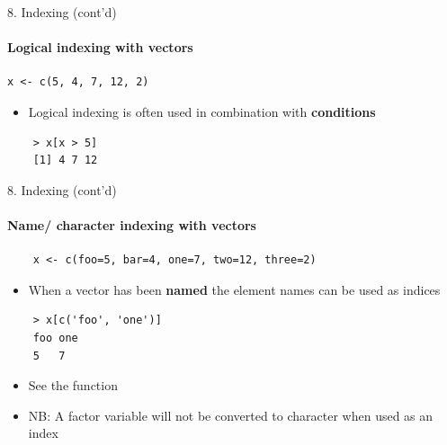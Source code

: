 \documentclass[14pt, aspectratio=169, sectionpage=simple, xclolor=table]{beamer}
\begin{document}
\begin{frame}[fragile]{8. Indexing (cont'd)}
\framesubtitle{Logical indexing with vectors}
\vspace*{-0.3ex}
{\small
\begin{verbatim}
x <- c(5, 4, 7, 12, 2)	
\end{verbatim}
}
\vspace*{-0.6ex}
	\begin{itemize}	
		\item Logical indexing is often used in combination with \textbf{conditions}
	\end{itemize}
\vspace*{-0.3ex}
{\small
	\begin{verbatim}
	> x[x > 5]
	[1] 4 7 12	
	\end{verbatim}
}
\end{frame}

\begin{frame}[fragile]{8. Indexing (cont'd)}
\framesubtitle{Name/ character indexing with vectors}
\vspace*{-1.2ex}
{\small
	\begin{verbatim}
	x <- c(foo=5, bar=4, one=7, two=12, three=2)	
	\end{verbatim}
\vspace*{-1ex}
\begin{itemize}	
	\item When a vector has been \textbf{named} the element names can be used as indices 
\end{itemize}
\vspace*{-1ex}
	\begin{verbatim}
	> x[c('foo', 'one')]
	foo one 
	5   7 	
	\end{verbatim}
\vspace*{-1ex}
\begin{itemize}	
	\item See the  function
	\item NB: A factor variable will not be converted to character when used as an index
\end{itemize}
}
\end{frame}

\end{document}
